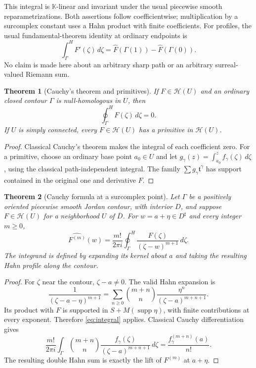 \documentclass[11pt,a4paper]{article}
\numberwithin{equation}{section}
\newtheorem{theorem}{Theorem}[section]
\theoremstyle{definition}
\newcommand{\K}{\mathbb K}
\newcommand{\tmon}{\mathfrak t}
\newcommand{\HH}{\mathscr H}
\newcommand{\supp}{\operatorname{supp}}
\newcommand{\hhat}[1]{\widehat{#1}}
\newcommand{\hint}{\int^{\!H}}
\newcommand{\hoint}{\oint^{\!H}}
\begin{document}
This integral is $\K$-linear and invariant under the usual piecewise smooth
reparametrizations. Both assertions follow coefficientwise; multiplication
by a surcomplex constant uses a Hahn product with finite coefficients.
For profiles, the usual fundamental-theorem identity at ordinary endpoints is
\[
 \hint_\Gamma F'(\zeta)\,d\zeta
   =\hhat F(\Gamma(1))-\hhat F(\Gamma(0)).
\]
No claim is made here about an arbitrary sharp path or an arbitrary
surreal-valued Riemann sum.

\begin{theorem}[Cauchy's theorem and primitives]\label{thm:cauchythm}
If $F\in\HH(U)$ and an ordinary closed contour $\Gamma$ is null-homologous
in $U$, then
\[
 \hoint_\Gamma F(\zeta)\,d\zeta=0.
\]
If $U$ is simply connected, every $F\in\HH(U)$ has a primitive in $\HH(U)$.
\end{theorem}
\begin{proof}
Classical Cauchy's theorem makes the integral of each coefficient zero.
For a primitive, choose an ordinary base point $a_0\in U$ and let
$g_\gamma(z)=\int_{a_0}^z f_\gamma(\zeta)\,d\zeta$, using the classical
path-independent integral. The family $\sum g_\gamma\tmon^\gamma$ has support
contained in the original one and derivative $F$.
\end{proof}

\begin{theorem}[Cauchy formula at a surcomplex point]\label{thm:cauchyformula}
Let $\Gamma$ be a positively oriented piecewise smooth Jordan contour, with
interior $D$, and suppose $F\in\HH(U)$ for a neighborhood $U$ of $\overline D$.
For $w=a+\eta\in D^\sharp$ and every integer $m\geq0$,
\begin{equation}\label{eq:cauchysharp}
 \hhat{F^{(m)}}(w)=
 \frac{m!}{2\pi i}\hoint_\Gamma
       \frac{F(\zeta)}{(\zeta-w)^{m+1}}\,d\zeta.
\end{equation}
The integrand is defined by expanding its kernel about $a$ and taking the
resulting Hahn profile along the contour.
\end{theorem}
\begin{proof}
For $\zeta$ near the contour, $\zeta-a\neq0$. The valid Hahn expansion is
\[
 \frac1{(\zeta-a-\eta)^{m+1}}
 =\sum_{n\geq0}\binom{m+n}{n}
       \frac{\eta^n}{(\zeta-a)^{m+n+1}}.
\]
Its product with $F$ is supported in $S+M(\supp\eta)$, with finite
contributions at every exponent. Therefore \eqref{eq:integral} applies.
Classical Cauchy differentiation gives
\[
 \frac{m!}{2\pi i}\int_\Gamma
 \binom{m+n}{n}\frac{f_\gamma(\zeta)}{(\zeta-a)^{m+n+1}}\,d\zeta
 =\frac{f_\gamma^{(m+n)}(a)}{n!}.
\]
The resulting double Hahn sum is exactly the lift of $F^{(m)}$ at $a+\eta$.
\end{proof}
\end{document}
